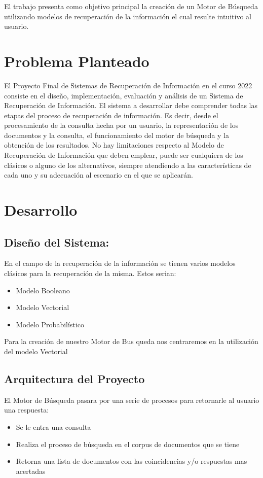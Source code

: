 \documentclass[runningheads]{llncs}
\begin{document}
El trabajo presenta como objetivo principal la creación de un Motor de Búsqueda utilizando modelos de recuperación de la información el cual resulte intuitivo al usuario.

\section*{Problema Planteado}
El Proyecto Final de Sistemas de Recuperación de Información en el curso 2022 consiste en el diseño, implementación, evaluación y análisis de un Sistema de Recuperación de Información. El sistema a desarrollar debe comprender todas las etapas del proceso de recuperación de información. Es decir, desde el procesamiento de la consulta hecha por un usuario, la representación de los documentos y la consulta, el funcionamiento del motor de búsqueda y la obtención de los resultados. No hay limitaciones respecto al Modelo de Recuperación de Información que deben emplear, puede ser cualquiera de los clásicos o alguno de los alternativos, siempre atendiendo a las características de cada uno y su adecuación al escenario en el que se aplicarán.

\section*{Desarrollo}
\subsection*{Diseño del Sistema:}
En el campo de la recuperación de la información se tienen varios modelos clásicos para la recuperación de la misma. Estos serian:
\begin{itemize}
	\item Modelo Booleano
	\item Modelo Vectorial
	\item Modelo Probabilístico
\end{itemize}
Para la creación de nuestro Motor de Bus queda nos centraremos en la utilización del modelo Vectorial

\subsection*{Arquitectura del Proyecto}
El Motor de Búsqueda pasara por una serie de procesos para retornarle al usuario una respuesta:
\begin{itemize}
	\item Se le entra una consulta
	\item Realiza el proceso de búsqueda en el corpus de documentos que se tiene
	\item Retorna una lista de documentos con las coincidencias y/o respuestas mas acertadas 
\end{itemize}
\end{document}
